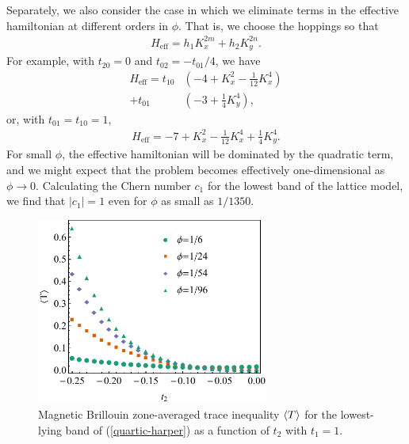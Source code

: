 \documentclass[aps,prb,twocolumn,letterpaper,twoside,nobalancelastpage,groupedaddress,amsmath,amssymb,floatfix,citeautoscript]{revtex4-1}
\begin{document}
Separately, we also consider the case in which we eliminate terms in the effective hamiltonian at different orders in $\phi$. That is, we choose the hoppings so that
\begin{align*}
H_{\text{eff}} = h_1 K_x^{2m} + h_2 K_y^{2n}.
\end{align*}
For example, with $t_{20} = 0$ and $t_{02}=-t_{01}/4$, we have
\begin{align*}
H_{\text{eff}} = t_{10}&\left(-4 + K_x^2 - \frac{1}{12}K_x^4\right)\\
+t_{01}&\left(-3+\frac{1}{4}K_y^4\right),
\end{align*}
or, with $t_{01}=t_{10}=1$, 
\begin{align*}
H_{\text{eff}} = -7 + K_x^2 - \frac{1}{12}K_x^4 +\frac{1}{4}K_y^4.
\end{align*}
For small $\phi$, the effective hamiltonian will be dominated by the quadratic term, and we might expect that the problem becomes effectively one-dimensional as $\phi \rightarrow 0$. Calculating the Chern number $c_1$ for the lowest band of the lattice model, we find that $|c_1| = 1$ even for $\phi$ as small as $1/1350$.
\begin{figure}[thb]
\centering
\includegraphics[width=3.0in]{trace-v-t2-mixed.pdf}
\caption{\label{trace-t2-mixed-plot}Magnetic Brillouin zone-averaged trace inequality $\expval{T}$ for the lowest-lying band of (\ref{quartic-harper}) as a function of $t_2$ with $t_1 = 1$.}
\end{figure}
\begin{align*}
\end{align*}

\end{document}
